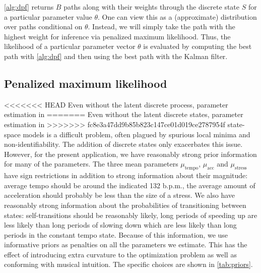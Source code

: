 \documentclass[aoas]{imsart}
\begin{document}
\autoref{alg:dpf} returns $B$ paths along with their weights through
the discrete state $S$ for a 
particular parameter value $\theta$. One
can view this as a (approximate) distribution over paths conditional
on $\theta$. Instead, we will simply take the path with the highest
weight for inference via penalized maximum likelihood. Thus, the
likelihood of a particular parameter vector $\theta$ is evaluated by
computing the best path with \autoref{alg:dpf} and then using the best
path with the Kalman filter.%

\subsection{Penalized maximum likelihood}
\label{sec:penal-maxim-likel}

<<<<<<< HEAD
Even without the latent discrete process, parameter estimation in
=======
Even without the latent discrete states, parameter estimation in
>>>>>>> fc8e3a47dd9b85b823c147ce01d019ce2787954f
state-space models is a difficult problem, often plagued by spurious
local minima and non-identifiability. The addition of discrete states
only exacerbates this issue. However, for the present application, we
have reasonably strong prior information for many of the
parameters. The three mean parameters $\mu_{\textrm{tempo}}$,
$\mu_{\textrm{acc}}$ and $\mu_{\textrm{stress}}$ have sign
restrictions in addition to strong information about their magnitude:
average tempo should be around the indicated 132 b.p.m., the average
amount of acceleration should probably be less than the size of a
stress. We also have reasonably strong information about the
probabilities of transitioning between states: self-transitions should
be reasonably likely, long periods of speeding up are less likely than
long periods of slowing down which are less likely than long periods
in the constant tempo state. Because of this information, we use
informative priors as penalties on all the parameters we
estimate. This has the effect of introducing extra curvature to the
optimization problem as well as conforming with musical intuition. The
specific choices are shown in \autoref{tab:priors}. 
\end{document}
